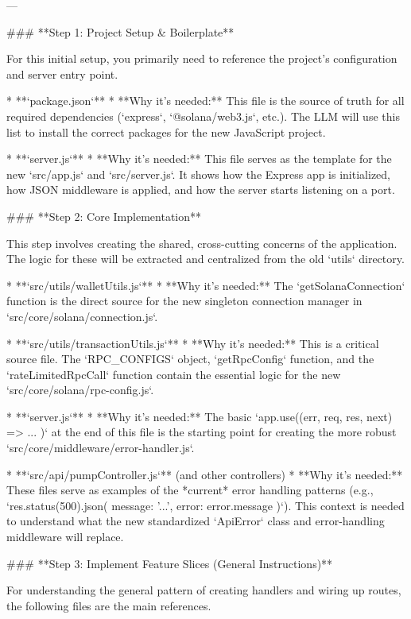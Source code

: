 ---

### **Step 1: Project Setup & Boilerplate**

For this initial setup, you primarily need to reference the project's configuration and server entry point.

*   **`package.json`**
    *   **Why it's needed:** This file is the source of truth for all required dependencies (`express`, `@solana/web3.js`, etc.). The LLM will use this list to install the correct packages for the new JavaScript project.

*   **`server.js`**
    *   **Why it's needed:** This file serves as the template for the new `src/app.js` and `src/server.js`. It shows how the Express app is initialized, how JSON middleware is applied, and how the server starts listening on a port.

### **Step 2: Core Implementation**

This step involves creating the shared, cross-cutting concerns of the application. The logic for these will be extracted and centralized from the old `utils` directory.

*   **`src/utils/walletUtils.js`**
    *   **Why it's needed:** The `getSolanaConnection` function is the direct source for the new singleton connection manager in `src/core/solana/connection.js`.

*   **`src/utils/transactionUtils.js`**
    *   **Why it's needed:** This is a critical source file. The `RPC_CONFIGS` object, `getRpcConfig` function, and the `rateLimitedRpcCall` function contain the essential logic for the new `src/core/solana/rpc-config.js`.

*   **`server.js`**
    *   **Why it's needed:** The basic `app.use((err, req, res, next) => { ... })` at the end of this file is the starting point for creating the more robust `src/core/middleware/error-handler.js`.

*   **`src/api/pumpController.js`** (and other controllers)
    *   **Why it's needed:** These files serve as examples of the *current* error handling patterns (e.g., `res.status(500).json({ message: '...', error: error.message })`). This context is needed to understand what the new standardized `ApiError` class and error-handling middleware will replace.

### **Step 3: Implement Feature Slices (General Instructions)**

For understanding the general pattern of creating handlers and wiring up routes, the following files are the main references.

